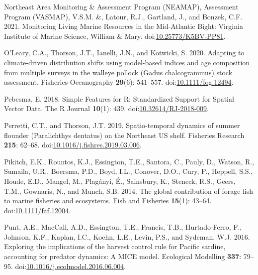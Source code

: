 \documentclass[
]{article}
\newlength{\cslhangindent}
\newlength{\cslentryspacingunit} %
\newenvironment{CSLReferences}[2] %
 {%
  \setlength{\parindent}{0pt}
  \ifodd #1
  \let\oldpar\par
  \def\par{\hangindent=\cslhangindent\oldpar}
  \fi
  \setlength{\parskip}{#2\cslentryspacingunit}
 }%
 {}
\begin{document}
\begin{CSLReferences}{1}{0}
\leavevmode{}%
Northeast Area Monitoring \& Assessment Program (NEAMAP), Assessment Program (VASMAP), V.S.M. \&, Latour, R.J., Gartland, J., and Bonzek, C.F. 2021. Monitoring {Living} {Marine} {Resources} in the {Mid}‐{Atlantic} {Bight}: Virginia Institute of Marine Science, William \& Mary. doi:\href{https://doi.org/10.25773/K5BV-PP81}{10.25773/K5BV-PP81}.

\leavevmode{}%
O'Leary, C.A., Thorson, J.T., Ianelli, J.N., and Kotwicki, S. 2020. Adapting to climate-driven distribution shifts using model-based indices and age composition from multiple surveys in the walleye pollock ({Gadus} chalcogrammus) stock assessment. Fisheries Oceanography \textbf{29}(6): 541--557. doi:\href{https://doi.org/10.1111/fog.12494}{10.1111/fog.12494}.

\leavevmode{}%
Pebesma, E. 2018. Simple {Features} for {R}: {Standardized} {Support} for {Spatial} {Vector} {Data}. The R Journal \textbf{10}(1): 439. doi:\href{https://doi.org/10.32614/RJ-2018-009}{10.32614/RJ-2018-009}.

\leavevmode{}%
Perretti, C.T., and Thorson, J.T. 2019. Spatio-temporal dynamics of summer flounder ({Paralichthys} dentatus) on the {Northeast} {US} shelf. Fisheries Research \textbf{215}: 62--68. doi:\href{https://doi.org/10.1016/j.fishres.2019.03.006}{10.1016/j.fishres.2019.03.006}.

\leavevmode{}%
Pikitch, E.K., Rountos, K.J., Essington, T.E., Santora, C., Pauly, D., Watson, R., Sumaila, U.R., Boersma, P.D., Boyd, I.L., Conover, D.O., Cury, P., Heppell, S.S., Houde, E.D., Mangel, M., Plagányi, É., Sainsbury, K., Steneck, R.S., Geers, T.M., Gownaris, N., and Munch, S.B. 2014. The global contribution of forage fish to marine fisheries and ecosystems. Fish and Fisheries \textbf{15}(1): 43--64. doi:\href{https://doi.org/10.1111/faf.12004}{10.1111/faf.12004}.

\leavevmode{}%
Punt, A.E., MacCall, A.D., Essington, T.E., Francis, T.B., Hurtado-Ferro, F., Johnson, K.F., Kaplan, I.C., Koehn, L.E., Levin, P.S., and Sydeman, W.J. 2016. Exploring the implications of the harvest control rule for {Pacific} sardine, accounting for predator dynamics: {A} {MICE} model. Ecological Modelling \textbf{337}: 79--95. doi:\href{https://doi.org/10.1016/j.ecolmodel.2016.06.004}{10.1016/j.ecolmodel.2016.06.004}.


\end{CSLReferences}
\end{document}
